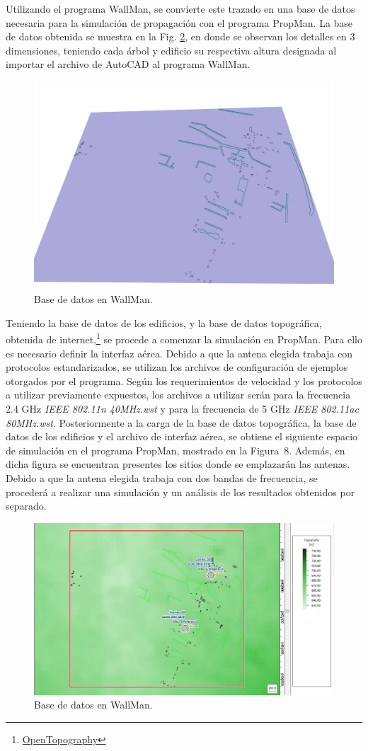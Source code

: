 \documentclass[11pt,a4paper]{article}
\begin{document}
Utilizando el programa WallMan, se convierte este trazado en una base de datos necesaria para la simulación de propagación con el programa PropMan. 
La base de datos obtenida se muestra en la Fig. \ref{fig:base_datos_wallman}, en donde se observan los detalles en 3 dimensiones, teniendo cada árbol y edificio su respectiva altura designada al importar el archivo de AutoCAD al programa WallMan.


\begin{figure}[htbp]
  \centering
  \includegraphics[width=0.5\linewidth]{fotos_ema/base_datos_wallman.jpg}
  \caption{Base de datos en WallMan.}
  \label{fig:base_datos_wallman}
\end{figure}

Teniendo la base de datos de los edificios, y la base de datos topográfica, obtenida de internet,\footnote{\href{https://opentopography.org}{OpenTopography}} se procede a comenzar la simulación en PropMan. 
Para ello es necesario definir la interfaz aérea. 
Debido a que la antena elegida trabaja con protocolos estandarizados, se utilizan los archivos de configuración de ejemplos otorgados por el programa. Según los requerimientos de velocidad y los protocolos a utilizar previamente expuestos, los archivos a utilizar serán para la frecuencia 2.4 GHz \textit{IEEE 802.11n 40MHz.wst }y para la frecuencia de 5 GHz \textit{IEEE 802.11ac 80MHz.wst}. 
Posteriormente a la carga de la base de datos topográfica, la base de datos de los edificios y el archivo de interfaz aérea, se obtiene el siguiente espacio de simulación en el programa PropMan, mostrado en la Figura~8. 
Además, en dicha figura se encuentran presentes los sitios donde se emplazarán las antenas. 
Debido a que la antena elegida trabaja con dos bandas de frecuencia, se procederá a realizar una simulación y un análisis de los resultados obtenidos por separado.

\begin{figure}[htbp]
  \centering
  \includegraphics[width=0.75\linewidth]{fotos_ema/sim_ubic_antenas.jpg}
  \caption{Base de datos en WallMan.}
  \label{fig:base_datos_wallman}
\end{figure}
\end{document}
